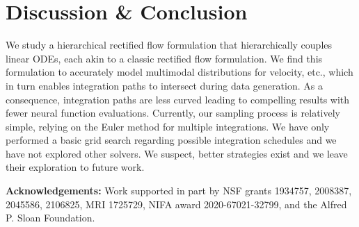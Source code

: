 \section{Discussion \& Conclusion}
\label{sec:conc}
We study a hierarchical rectified flow formulation that hierarchically couples linear ODEs, each akin to a classic rectified flow formulation. We find this formulation to accurately model multimodal distributions for velocity, etc., which in turn enables integration paths to intersect during data generation. As a consequence, integration paths are less curved leading to compelling results with fewer neural function evaluations. 
Currently, our sampling process is relatively simple, relying on the Euler method for multiple integrations. %
We have only performed a basic grid search regarding possible integration schedules and we have not explored other solvers. %
We suspect, better strategies exist and we leave their exploration to future work.




\noindent\textbf{Acknowledgements:} Work supported in part by NSF grants 1934757, 2008387, 2045586, 2106825, MRI 1725729, NIFA award 2020-67021-32799, and the Alfred P. Sloan Foundation.

